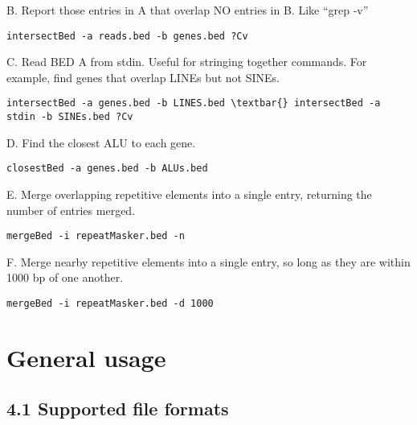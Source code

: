 \documentclass[letterpaper,10pt,english]{sphinxmanual}
\begin{document}
B. Report those entries in A that overlap NO entries in B. Like ``grep -v''

\begin{Verbatim}[commandchars=\\\{\}]
intersectBed -a reads.bed -b genes.bed ?Cv
\end{Verbatim}

C. Read BED A from stdin. Useful for stringing together commands. For example, find genes that overlap LINEs
but not SINEs.

\begin{Verbatim}[commandchars=\\\{\}]
intersectBed -a genes.bed -b LINES.bed \textbar{} intersectBed -a stdin -b SINEs.bed ?Cv
\end{Verbatim}

D. Find the closest ALU to each gene.

\begin{Verbatim}[commandchars=\\\{\}]
closestBed -a genes.bed -b ALUs.bed
\end{Verbatim}

E. Merge overlapping repetitive elements into a single entry, returning the number of entries merged.

\begin{Verbatim}[commandchars=\\\{\}]
mergeBed -i repeatMasker.bed -n
\end{Verbatim}

F. Merge nearby repetitive elements into a single entry, so long as they are within 1000 bp of one another.

\begin{Verbatim}[commandchars=\\\{\}]
mergeBed -i repeatMasker.bed -d 1000
\end{Verbatim}


\section{General usage}
\label{content/general-usage::doc}\label{content/general-usage:general-usage}

\subsection{4.1 Supported file formats}
\label{content/general-usage:supported-file-formats}
\end{document}
